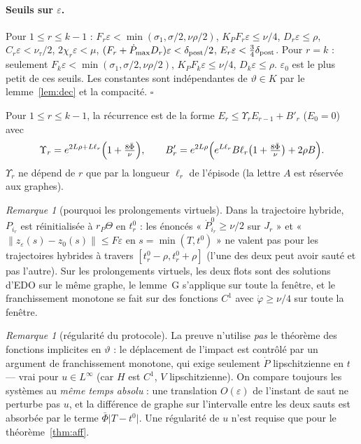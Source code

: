 \documentclass[11pt,a4paper]{article}
\theoremstyle{remark}
\newtheorem{remarque}[theoreme]{Remarque}
\theoremstyle{definition}
\newcommand{\norm}[1]{\lVert #1\rVert}
\newcommand{\eps}{\varepsilon}
\newcommand{\vth}{\vartheta}
\begin{document}
\paragraph{Seuils sur $\eps$.} Pour $1\le r\le k-1$ : $F_r\eps<\min(\sigma_1,\sigma/2,\nu\rho/2)$, $K_PF_r\eps\le\nu/4$, $D_r\eps\le\rho$, $C_r\eps<\nu_\tau/2$, $2\chi_r\eps<\mu$, $(F_r+\dot P_{\max}D_r)\eps<\delta_{\rm post}/2$, $E_r\eps<\tfrac34\delta_{\rm post}$. Pour $r=k$ : seulement $F_k\eps<\min(\sigma_1,\sigma/2,\nu\rho/2)$, $K_PF_k\eps\le\nu/4$, $D_k\eps\le\rho$. $\eps_0$ est le plus petit de ces seuils. Les constantes sont indépendantes de $\vth\in K$ par le lemme~\ref{lem:dec} et la compacité. $\square$

Pour $1\le r\le k-1$, la récurrence est de la forme $E_r\le\Upsilon_rE_{r-1}+B'_r$ ($E_0=0$) avec
\[
\Upsilon_r=e^{2L\rho+L\ell_r}\Bigl(1+\tfrac{8\bar\Phi}\nu\Bigr),\qquad
B'_r=e^{2L\rho}\Bigl(e^{L\ell_r}B\ell_r\bigl(1+\tfrac{8\bar\Phi}\nu\bigr)+2\rho B\Bigr).
\]
$\Upsilon_r$ ne dépend de $r$ que par la longueur $\ell_r$ de l'épisode (la lettre $A$ est réservée aux graphes).

\begin{remarque}[pourquoi les prolongements virtuels]
Dans la trajectoire hybride, $P_{i_r}$ est réinitialisée à $r_P\Theta$ en $t_r^0$ : les énoncés « $\dot P^0_{i_r}\ge\nu/2$ sur $J_r$ » et « $\norm{z_\eps(s)-z_0(s)}\le F\eps$ en $s=\min(T,t^0)$ » ne valent pas pour les trajectoires hybrides à travers $[t_r^0-\rho,t_r^0+\rho]$ (l'une des deux peut avoir sauté et pas l'autre). Sur les prolongements virtuels, les deux flots sont des solutions d'EDO sur le même graphe, le lemme~G s'applique sur toute la fenêtre, et le franchissement monotone se fait sur des fonctions $C^1$ avec $\dot\varphi\ge\nu/4$ sur toute la fenêtre.
\end{remarque}

\begin{remarque}[régularité du protocole]
La preuve n'utilise \emph{pas} le théorème des fonctions implicites en $\vth$ : le déplacement de l'impact est contrôlé par un argument de franchissement monotone, qui exige seulement $\dot P$ lipschitzienne en $t$ --- vrai pour $u\in L^\infty$ (car $H$ est $C^1$, $V$ lipschitzienne). On compare toujours les systèmes au \emph{même temps absolu} : une translation $O(\eps)$ de l'instant de saut ne perturbe pas $u$, et la différence de graphe sur l'intervalle entre les deux sauts est absorbée par le terme $\bar\Phi\lvert T-t^0\rvert$. Une régularité de $u$ n'est requise que pour le théorème~\ref{thm:aff}.
\end{remarque}
\end{document}
